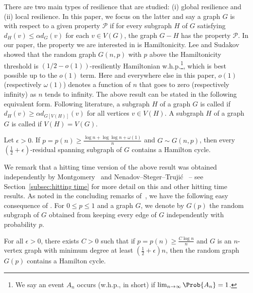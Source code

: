 \documentclass[10pt,a4paper,reqno]{amsart}
\begin{document}
There are two main types of resilience that are studied: (i) global resilience and (ii) local resilience. In this paper, we focus on the latter and say a graph $G$ is  with respect to a given property $\mathcal{P}$ if for every subgraph $H$ of $G$ satisfying $d_H(v)\le \alpha d_G(v)$ for each $v\in V(G)$, the graph $G-H$ has the property $\mathcal{P}$. In our paper, the property we are interested in is Hamiltonicity. Lee and Sudakov~\cite{Lee2012Dirac} showed that the random graph $G(n,p)$ with $p$ above the Hamiltonicity threshold is $(1/2-o(1))$-resiliently Hamiltonian w.h.p.\footnote{We say an event $A_n$ occurs  (w.h.p., in short) if $\lim_{n\rightarrow \infty} \Prob{A_n} = 1$.}, which is best possible up to the $o(1)$ term. Here and everywhere else in this paper, $o(1)$ (respectively $\omega(1)$) denotes a function of $n$ that goes to zero (respectively infinity) as $n$ tends to infinity. 
The above result can be stated in the following equivalent form. 
Following literature, a subgraph $H$ of a graph $G$ is called  if $d_H(v) \ge \alpha d_{G[V(H)]}(v)$ for all vertices $v\in V(H)$. A subgraph $H$ of a graph $G$ is called  if $V(H)=V(G)$.

\begin{theorem} \label{thm:Dirac theorem in random graphs}
    Let $\epsilon >0$. If $p =  p(n) \ge \frac{\log{n} + \log\log{n} + \omega(1)}{n}$ and $G \sim G(n,p)$, then \whp every $\left(\frac{1}{2} + \epsilon\right)$-residual spanning subgraph of $G$ contains a Hamilton cycle. 
\end{theorem}


We remark that a hitting time version of the above result was obtained independently by Montgomery~\cite{Montgomery2019resilient} and Nenadov--Steger--Truji\'c~\cite{Nenadov2019Resilience} -- see Section~\ref{subsec:hitting time} for more detail on this and other hitting time results. As noted in the concluding remarks of~\cite{Krivelevich2014robust}, we have the following easy consequence of . For $0\le p\le 1$ and a graph $G$, we denote by $G(p)$ the random subgraph of $G$ obtained from keeping every edge of $G$ independently with probability $p$.

\begin{corollary}\label{cor:Lee-Sudakov}
    For all $\epsilon >0$, there exists $C >0$ such that if $p =  p(n) \ge \frac{C\log{n}}{n}$ and $G$ is an $n$-vertex graph with minimum degree at least $\left(\frac{1}{2} + \epsilon\right)n$, then \whp the random graph $G(p)$ contains a Hamilton cycle. 
\end{corollary}
\end{document}
